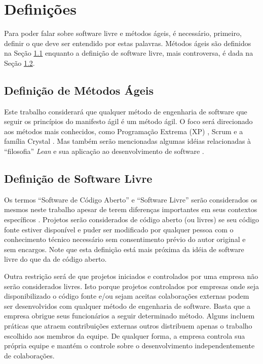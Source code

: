 \chapter{Definições}
\label{cap:definicoes}

Para poder falar sobre software livre e métodos ágeis, é necessário,
primeiro, definir o que deve ser entendido por estas palavras. Métodos
ágeis são definidos na Seção \ref{sec:agile-def} enquanto a definição
de software livre, mais controversa, é dada na Seção \ref{sec:os-def}.

\section{Definição de Métodos Ágeis}
\label{sec:agile-def}

Este trabalho considerará que qualquer método de engenharia de
software que seguir os princípios do manifesto ágil
\cite{AgileManifesto} é um método ágil. O foco será direcionado aos
métodos mais conhecidos, como Programação Extrema (XP) \cite{XP02},
Scrum \cite{Schwaber2004} e a família Crystal \cite{Cockburn2002}. Mas
também serão mencionadas algumas idéias relacionadas à ``filosofia''
\emph{Lean} \cite{Ohno1998} e sua aplicação ao desenvolvimento de
software \cite{Poppendieck2005}.

\section{Definição de Software Livre}
\label{sec:os-def}

Os termos ``Software de Código Aberto'' e ``Software Livre'' serão
considerados os mesmos neste trabalho apesar de terem diferenças
importantes em seus contextos específicos \cite[Ch. 1, Free Versus
Open source]{Fogel2005}. Projetos serão considerados de código aberto
(ou livres) se seu código fonte estiver disponível e puder ser
modificado por qualquer pessoa com o conhecimento técnico necessário
sem consentimento prévio do autor original e sem encargos. Note que
esta definição está mais próxima da idéia de software livre do que da
de código aberto.

Outra restrição será de que projetos iniciados e controlados por uma
empresa não serão considerados livres. Isto porque projetos
controlados por empresas onde seja disponibilizado o código fonte e/ou
sejam aceitas colaborações externas podem ser desenvolvidos com
qualquer método de engenharia de software. Basta que a empresa obrigue
seus funcionários a seguir determinado método. Alguns incluem práticas
que atraem contribuições externas outros distribuem apenas o trabalho
escolhido aos membros da equipe. De qualquer forma, a empresa controla
sua própria equipe e mantém o controle sobre o desenvolvimento
independentemente de colaborações.

